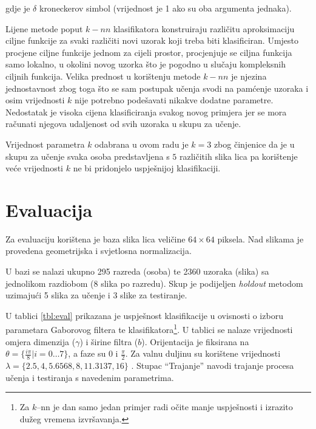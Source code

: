 \documentclass{ru}
\begin{document}
gdje je $\delta$ kroneckerov simbol (vrijednost je 1 ako su oba argumenta jednaka).


Lijene metode poput $k-nn$ klasifikatora konstruiraju različitu aproksimaciju
ciljne funkcije za svaki različiti novi uzorak koji treba biti klasificiran. Umjesto
procjene ciljne funkcije jednom za cijeli prostor, procjenjuje se ciljna funkcija
samo lokalno, u okolini novog uzorka što je pogodno u slučaju kompleksnih ciljnih
funkcija. Velika prednost u korištenju metode $k-nn$ je njezina jednostavnost
zbog toga što se sam postupak učenja svodi na pamćenje uzoraka i osim vrijednosti
$k$ nije potrebno podešavati nikakve dodatne parametre. Nedostatak je visoka
cijena klasificiranja svakog novog primjera jer se mora računati njegova
udaljenost od svih uzoraka u skupu za učenje.

Vrijednost parametra $k$ odabrana u ovom radu je $k = 3$ zbog činjenice da je u
skupu za učenje svaka osoba predstavljena s $5$ različitih slika lica pa
korištenje veće vrijednosti $k$ ne bi pridonjelo uspješnijoj klasifikaciji.

\chapter{Evaluacija}
\label{ch:eval}
Za evaluaciju korištena je baza slika lica veličine $64 \times 64$ piksela. Nad
slikama je provedena geometrijska i svjetlosna normalizacija. 

U bazi se nalazi ukupno 295 razreda (osoba) te 2360 uzoraka (slika) sa
jednolikom razdiobom (8 slika po razredu). Skup je podijeljen \emph{holdout} metodom
uzimajući 5 slika za učenje i 3 slike za testiranje.

U tablici \ref{tbl:eval} prikazana je uspješnost klasifikacije u ovisnosti o izboru
parametara Gaborovog filtera te klasifikatora\footnote{Za $k$--nn je dan samo
jedan primjer radi očite manje uspješnosti i izrazito dužeg vremena
izvršavanja.}. U tablici se nalaze vrijednosti omjera dimenzija ($\gamma$) i širine filtra ($b$).
Orijentacija je fiksirana na $\theta = \{ \frac{i \pi}{8} | i =
0 \ldots 7\}$, a faze su $0$ i $\frac{\pi}{2}$. Za valnu duljinu su korištene
vrijednosti $\lambda = \{2.5, 4, 5.6568, 8, 11.3137, 16\}$
\citep{shen2007gabor}. Stupac ``Trajanje'' navodi trajanje procesa učenja i
testiranja s navedenim parametrima.
\end{document}
